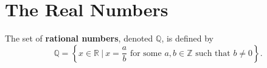 \chapter{The Real Numbers}
\begin{definition}
	\label{definition-appendix-2-the-real-numbers}
	\cite{the-real-numbers-and-real-analysis}
	The set of \textbf{rational numbers}, denoted $\mathbb{Q}$, is defined by
	\begin{equation}
	\mathbb{Q} = \left\lbrace x \in \mathbb{R} \: | \: x = \frac{a}{b} \text{ for some } a,b \in \mathbb{Z} \text{ such that } b \neq 0 \right\rbrace.
	\end{equation}
\end{definition}
